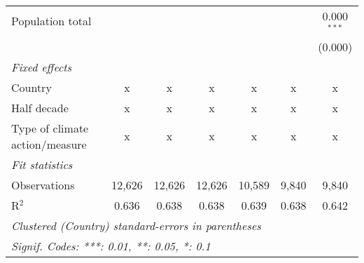 \begin{tabular}{lcccccc}
   Population total                                                         &         &               &               &               &               & 0.000$^{***}$\\   
                                                                            &         &               &               &               &               & (0.000)\\   
   \emph{Fixed effects}\\
   Country                                                                  & x       & x             & x             & x             & x             & x\\  
   Half decade                                                              & x       & x             & x             & x             & x             & x\\  
   Type of climate action/measure                                           & x       & x             & x             & x             & x             & x\\  
   \midrule \emph{Fit statistics}\\
   Observations                                                             & 12,626  & 12,626        & 12,626        & 10,589        & 9,840         & 9,840\\  
   R$^2$                                                                    & 0.636   & 0.638         & 0.638         & 0.639         & 0.638         & 0.642\\  
   \midrule
   \multicolumn{7}{l}{\emph{Clustered (Country) standard-errors in parentheses}}\\
   \multicolumn{7}{l}{\emph{Signif. Codes: ***: 0.01, **: 0.05, *: 0.1}}\\
\end{tabular}
\par\endgroup


